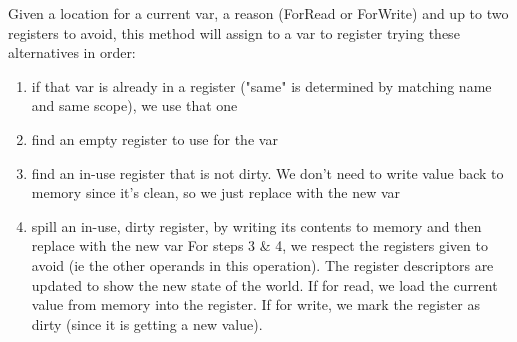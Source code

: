 \documentclass[11pt]{article}
\begin{document}
  Given a location for a current var, a reason (ForRead or ForWrite)
  and up to two registers to avoid, this method will assign
to a var to register trying these alternatives in order:
\begin{enumerate}
\item if that var is already in a register ("same" is determined
by matching name and same scope), we use that one
\item find an empty register to use for the var
\item find an in-use register that is not dirty.  We don't need
to write value back to memory since it's clean, so we just
 replace with the new var
\item spill an in-use, dirty register, by writing its contents to
    memory and then replace with the new var
For steps 3 \& 4, we respect the registers given to avoid (ie the
other operands in this operation). The register descriptors are
updated to show the new state of the world. If for read, we
load the current value from memory into the register. If for
write, we mark the register as dirty (since it is getting a
new value).
\end{enumerate}
\end{document}
